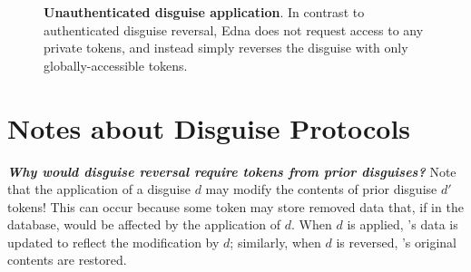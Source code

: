 \begin{figure*}
    \caption{\textbf{Unauthenticated disguise application}. In contrast to authenticated disguise
    reversal, Edna does not request access to any private tokens, and instead simply reverses the disguise  
    with only globally-accessible tokens.}
\end{figure*}

\section{Notes about Disguise Protocols}
\textbf{\emph{Why would disguise reversal require tokens from prior disguises?}} 
Note that the application of a disguise $d$ may modify the contents of prior disguise $d'$ tokens!
This can occur because some token \tdata{} may store removed data that, if in the database, would be
affected by the application of $d$. When $d$ is applied, \tdata{}'s data is updated to reflect the
modification by $d$; similarly, when $d$ is reversed, \tdata{}'s original contents are restored.

